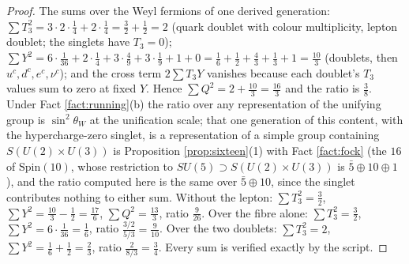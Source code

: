 \documentclass[11pt]{article}
\theoremstyle{definition}
\begin{document}
\begin{proof}
The sums over the Weyl fermions of one derived generation: $\sum T_{3}^{2} = 3 \cdot 2 \cdot \tfrac14 + 2 \cdot \tfrac14 = \tfrac32 + \tfrac12 = 2$ (quark doublet with colour multiplicity, lepton doublet; the singlets have $T_{3} = 0$); $\sum Y^{2} = 6 \cdot \tfrac{1}{36} + 2 \cdot \tfrac14 + 3 \cdot \tfrac49 + 3 \cdot \tfrac19 + 1 + 0 = \tfrac16 + \tfrac12 + \tfrac43 + \tfrac13 + 1 = \tfrac{10}{3}$ (doublets, then $u^{c}, d^{c}, e^{c}, \nu^{c}$); and the cross term $2\sum T_{3}Y$ vanishes because each doublet's $T_{3}$ values sum to zero at fixed $Y$. Hence $\sum Q^{2} = 2 + \tfrac{10}{3} = \tfrac{16}{3}$ and the ratio is $\tfrac38$. Under Fact \ref{fact:running}(b) the ratio over any representation of the unifying group is $\sin^{2}\theta_{W}$ at the unification scale; that one generation of this content, with the hypercharge-zero singlet, is a representation of a simple group containing $S(U(2) \times U(3))$ is Proposition \ref{prop:sixteen}(1) with Fact \ref{fact:fock} (the $16$ of $\mathrm{Spin}(10)$, whose restriction to $SU(5) \supset S(U(2) \times U(3))$ is $\bar{5} \oplus 10 \oplus 1$), and the ratio computed here is the same over $\bar{5} \oplus 10$, since the singlet contributes nothing to either sum. Without the lepton: $\sum T_{3}^{2} = \tfrac32$, $\sum Y^{2} = \tfrac{10}{3} - \tfrac12 = \tfrac{17}{6}$, $\sum Q^{2} = \tfrac{13}{3}$, ratio $\tfrac{9}{26}$. Over the fibre alone: $\sum T_{3}^{2} = \tfrac32$, $\sum Y^{2} = 6 \cdot \tfrac{1}{36} = \tfrac16$, ratio $\tfrac{3/2}{5/3} = \tfrac{9}{10}$. Over the two doublets: $\sum T_{3}^{2} = 2$, $\sum Y^{2} = \tfrac16 + \tfrac12 = \tfrac23$, ratio $\tfrac{2}{8/3} = \tfrac34$. Every sum is verified exactly by the script.
\end{proof}
\end{document}
